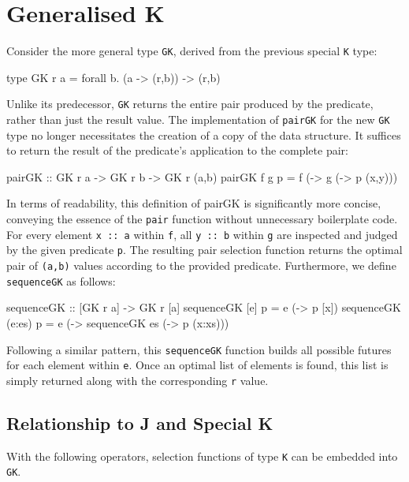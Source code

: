 \documentclass[runningheads]{llncs}
\begin{document}
\section{Generalised K}\label{generalised-k}

Consider the more general type \texttt{GK}, derived from the previous
special \texttt{K} type:

\begin{code}
type GK r a = forall b. (a -> (r,b)) -> (r,b)
\end{code}

Unlike its predecessor, \texttt{GK} returns the entire pair produced by
the predicate, rather than just the result value. The implementation of
\texttt{pairGK} for the new \texttt{GK} type no longer necessitates the
creation of a copy of the data structure. It suffices to return the
result of the predicate's application to the complete pair:

\begin{code}
pairGK :: GK r a -> GK r b -> GK r (a,b)
pairGK f g p = f (\x -> g (\y -> p (x,y)))
\end{code}

In terms of readability, this definition of pairGK is significantly more
concise, conveying the essence of the \texttt{pair} function without
unnecessary boilerplate code. For every element \texttt{x\ ::\ a} within
\texttt{f}, all \texttt{y\ ::\ b} within \texttt{g} are inspected and
judged by the given predicate \texttt{p}. The resulting pair selection
function returns the optimal pair of \texttt{(a,b)} values according to
the provided predicate. Furthermore, we define \texttt{sequenceGK} as
follows:

\begin{code}
sequenceGK :: [GK r a] -> GK r [a]
sequenceGK [e] p    = e (\x -> p [x])
sequenceGK (e:es) p = e (\x -> sequenceGK es (\xs -> p (x:xs)))
\end{code}

Following a similar pattern, this \texttt{sequenceGK} function builds
all possible futures for each element within \texttt{e}. Once an optimal
list of elements is found, this list is simply returned along with the
corresponding \texttt{r} value.

\subsection{Relationship to J and Special
K}\label{relationship-to-j-and-special-k}

With the following operators, selection functions of type \texttt{K} can
be embedded into \texttt{GK}.
\end{document}
